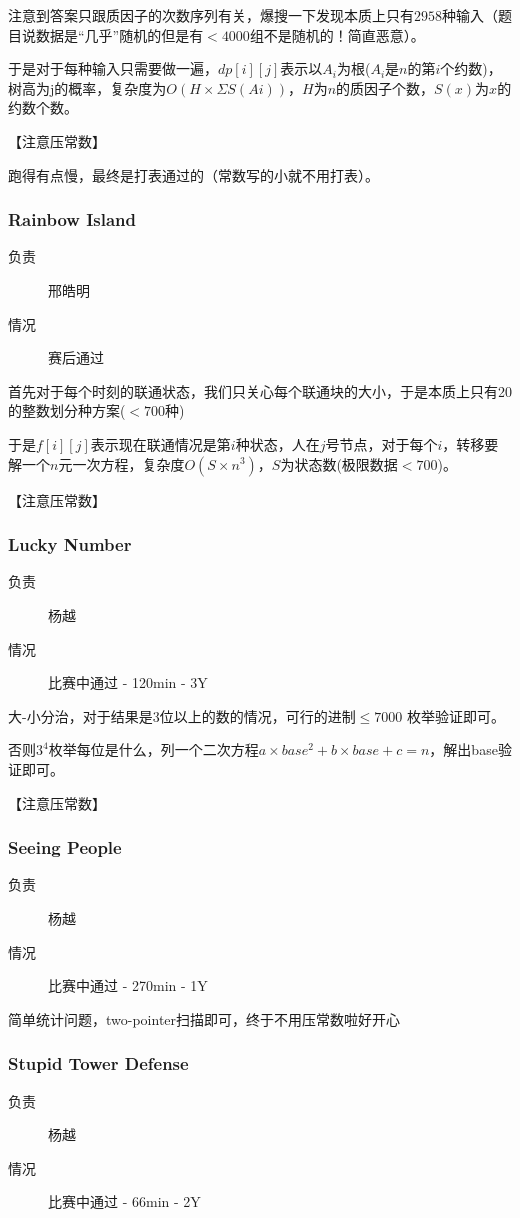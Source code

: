 \documentclass[a4paper, 11pt, nofonts, nocap, fancyhdr]{ctexart}
\newcommand{\problem}[1]{\subsubsection{#1}}
\begin{document}
注意到答案只跟质因子的次数序列有关，爆搜一下发现本质上只有$2958$种输入（题目说数据是“几乎”随机的但是有$<4000$组不是随机的！简直恶意）。

于是对于每种输入只需要做一遍，$dp[i][j]$表示以$A_i$为根($A_i$是$n$的第$i$个约数)，树高为j的概率，复杂度为$O(H \times ΣS(Ai))$，$H$为$n$的质因子个数，$S(x)$为$x$的约数个数。

【注意压常数】

跑得有点慢，最终是打表通过的（常数写的小就不用打表）。

\problem{Rainbow Island}

\begin{description}
\item[负责] 邢皓明
\item[情况] 赛后通过
\end{description}

首先对于每个时刻的联通状态，我们只关心每个联通块的大小，于是本质上只有20的整数划分种方案($<700$种)

于是$f[i][j]$表示现在联通情况是第$i$种状态，人在$j$号节点，对于每个$i$，转移要解一个$n$元一次方程，复杂度$O(S \times n^3)$，$S$为状态数(极限数据$<700$)。

【注意压常数】

\problem{Lucky Number}

\begin{description}
\item[负责] 杨越
\item[情况] 比赛中通过 - 120min - 3Y
\end{description}

大-小分治，对于结果是3位以上的数的情况，可行的进制$\leq 7000$ 枚举验证即可。

否则$3^4$枚举每位是什么，列一个二次方程$a\times base^2+b\times base+c=n$，解出base验证即可。

【注意压常数】

\problem{Seeing People}

\begin{description}
\item[负责] 杨越
\item[情况] 比赛中通过 - 270min - 1Y
\end{description}

简单统计问题，two-pointer扫描即可，终于不用压常数啦好开心

\problem{Stupid Tower Defense}

\begin{description}
\item[负责] 杨越
\item[情况] 比赛中通过 - 66min - 2Y
\end{description}
\end{document}
